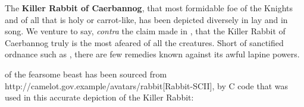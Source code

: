 \documentclass{metanorma}
\begin{document}


The \textbf{Killer Rabbit of Caerbannog}, that most formidable foe of
the Knights and of all that is holy or carrot-like, has been
depicted diversely in lay and in song. We venture to say,
\textit{contra} the claim made in ,
that the Killer Rabbit of Caerbannog truly is the most afeared
of all the creatures. Short of sanctified ordnance such as
, there are few remedies
known against its awful lapine powers.



 of the fearsome beast
has been sourced from
http://camelot.gov.example/avatars/rabbit[Rabbit-SCII],
by C code that was used in this accurate depiction of the
Killer Rabbit:


\end{document}
